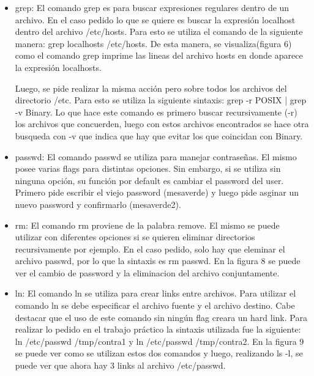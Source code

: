 \documentclass[a4paper, 12pt]{article}
\begin{document}
\begin{itemize}
Cabe destacar que el comando chmod se utiliz\'o varias veces para ir cambiando de a poco los permisos seg\'un sean para el usuario, para el grupo o para los otros. Sin embargo, esto se puede realizar utilizando una sola vez el comando chmod. La sintaxis para el mismo ser\'ia chmod 751 passwd. El numero 751 esta es una manera de codificar los permisos, el 7(111) corresponde al user y esta poniendo en 1 los 3 permisos; el 5(101) es para el grupo, dado un orden predispuesto, lo que hace esto es setear en 1 los permisos de Read y eXecute, que son el primero y el tercero respectivamente, y setea en 0 el segundo permiso(Write). Por \'ultimo, el 1(001) corresponde a setear el permiso de eXecute para los Others.

\item grep: El comando grep es para buscar expresiones regulares dentro de un archivo. En el caso pedido lo que se quiere es buscar la expresi\'on localhost dentro del archivo /etc/hosts. Para esto se utiliza el comando de la siguiente manera: grep localhosts /etc/hosts. De esta manera, se visualiza(figura 6) como el comando grep imprime las lineas del archivo hosts en donde aparece la expresi\'on localhosts.

Luego, se pide realizar la misma acci\'on pero sobre todos los archivos del directorio /etc.
Para esto se utiliza la siguiente sintaxis: grep -r POSIX | grep -v Binary. Lo que hace este comando es primero buscar recursivamente (-r) los archivos que concuerden, luego con estos archivos encontrados se hace otra busqueda con -v que indica que hay que evitar los que coincidan con Binary.

\item passwd: El comando passwd se utiliza para manejar contrase\~{n}as. El mismo posee varias flags para distintas opciones. Sin embargo, si se utiliza sin ninguna opci\'on, su funci\'on por default es cambiar el password del user. Primero pide escribir el viejo password (mesaverde) y luego pide asginar un nuevo password y confirmarlo (mesaverde2).

\item rm: El comando rm proviene de la palabra remove. El mismo se puede utilizar con diferentes opciones si se quieren eliminar directorios recursivamente por ejemplo. En el caso pedido, solo hay que eleminar el archivo passwd, por lo que la sintaxis es rm passwd. En la figura 8 se puede ver el cambio de password y la eliminacion del archivo conjuntamente.

\item ln: El comando ln se utiliza para crear links entre archivos. Para utilizar el comando ln se debe especificar el archivo fuente y el archivo destino. Cabe destacar que el uso de este comando sin ning\'un flag creara un hard link. Para realizar lo pedido en el trabajo pr\'actico la sintaxis utilizada fue la siguiente: ln /etc/passwd /tmp/contra1 y ln /etc/passwd /tmp/contra2. En la figura 9 se puede ver como se utilizan estos dos comandos y luego, realizando ls -l, se puede ver que ahora hay 3 links al archivo /etc/passwd.


\end{itemize}
\end{document}
